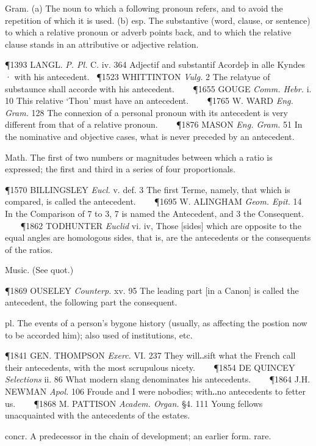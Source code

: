 \begin{description}[wide, labelwidth=!, labelindent=0pt]
\begin{myenumerate}
 Gram. (a) The noun to which a following pronoun refers, and to avoid the
repetition of which it is used. (b) esp. The substantive (word, clause, or
sentence) to which a relative pronoun or adverb points back, and to which the
relative clause stands in an attributive or adjective relation. 

\P 1393 LANGL. \textit{P. Pl.} C. iv. 364 Adjectif and substantif Acordeþ in alle Kyndes · with his antecedent. 
\P 1523 WHITTINTON \textit{Vulg.} 2 The relatyue of substaunce
shall accorde with his antecedent.    
\P 1655 GOUGE \textit{Comm. Hebr.} i. 10 This relative
‘Thou’ must have an antecedent.    
\P 1765 W. WARD \textit{Eng. Gram.} 128 The connexion of
a personal pronoun with its antecedent is very different from that of a relative
pronoun.    
\P 1876 MASON \textit{Eng. Gram.} 51 In the nominative and objective cases, what
is never preceded by an antecedent.

 Math. The first of two numbers or magnitudes between which a ratio is
expressed; the first and third in a series of four proportionals. 

\P 1570 BILLINGSLEY \textit{Eucl.} v. def. 3 The first Terme, namely, that which is
compared, is called the antecedent.    
\P 1695 W. ALINGHAM \textit{Geom. Epit.} 14 In the
Comparison of 7 to 3, 7 is named the Antecedent, and 3 the Consequent.    
\P 1862 TODHUNTER \textit{Euclid} vi. iv, Those [sides] which are opposite to the equal angles
are homologous sides, that is, are the antecedents or the consequents of the ratios.

 Music. (See quot.) 

\P 1869 OUSELEY \textit{Counterp.} xv. 95 The leading part [in a Canon] is called the
antecedent, the following part the consequent.

 pl. The events of a person's bygone history (usually, as affecting the
postion now to be accorded him); also used of institutions, etc. 

\P 1841 GEN. THOMPSON \textit{Exerc.} VI. 237 They will‥sift what the French call their
antecedents, with the most scrupulous nicety.    
\P 1854 DE QUINCEY \textit{Selections} ii. 86 What modern slang denominates his antecedents.    
\P 1864 J.H. NEWMAN \textit{Apol.} 106 Froude and I were nobodies; with‥no antecedents to fetter us.    
\P 1868 M. PATTISON \textit{Academ. Organ.} §4. 111 Young fellows unacquainted with the antecedents
of the estates.

 concr. A predecessor in the chain of development; an earlier form. rare. 


\end{myenumerate}
\end{description}
